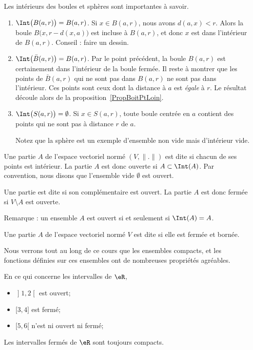 \begin{example}			\label{ExempleIntBoules}
	Les intérieurs des boules et sphères sont importantes à savoir.
	\begin{enumerate}
		\item
		      $\Int\big( B(a,r) \big)=B(a,r)$. Si $x\in B(a,r)$, nous avons $d(a,x)<r$. Alors la boule $B\big(x,r-d(x,a)\big)$ est incluse à $B(a,r)$, et donc $x$ est dans l'intérieur de $B(a,r)$. Conseil : faire un dessin.
		\item
		      $\Int\big( \bar B(a,r) \big)=B(a,r)$. Par le point précédent, la boule $B(a,r)$ est certainement dans l'intérieur de la boule fermée. Il reste à montrer que les points de $\bar B(a,r)$ qui ne sont pas dans $B(a,r)$ ne sont pas dans l'intérieur. Ces points sont ceux dont la distance à $a$ est \emph{égale} à $r$. Le résultat découle alors de la proposition~\ref{PropBoitPtLoin}.

		\item
		      $\Int\big( S(a,r) \big)=\emptyset$. Si $x\in S(a,r)$, toute boule centrée en $a$ contient des points qui ne sont pas à distance $r$ de $a$.

		      Notez que la sphère est un exemple d'ensemble non vide mais d'intérieur vide.
	\end{enumerate}
\end{example}


\begin{definition}
	Une partie $A$ de l'espace vectoriel normé $(V,\| . \|)$ est dite  si chacun de ses points est intérieur. La partie $A$ est donc ouverte si $A\subset\Int(A)$. Par convention, nous disons que l'ensemble vide $\emptyset$ est ouvert.

	Une partie est dite  si son complémentaire est ouvert. La partie $A$ est donc fermée si $V\setminus A$ est ouverte.
\end{definition}

Remarque : un ensemble $A$ est ouvert si et seulement si $\Int(A)=A$.

\begin{definition}
	Une partie $A$ de l'espace vectoriel normé $V$ est dite  si elle est fermée et bornée.
\end{definition}

Nous verrons tout au long de ce cours que les ensembles compacts, et les fonctions définies sur ces ensembles ont de nombreuses propriétés agréables.

\begin{example}		\label{ExempleFermeIntevrR}
	En ce qui concerne les intervalles de $\eR$,
	\begin{itemize}
		\item $\mathopen] 1 , 2 \mathclose[$ est ouvert;
		\item $\mathopen[ 3,  4 \mathclose]$ est fermé;
		\item $\mathopen[ 5 , 6 [$ n'est ni ouvert ni fermé;
	\end{itemize}
	Les intervalles fermés de $\eR$ sont toujours compacts.
\end{example}

